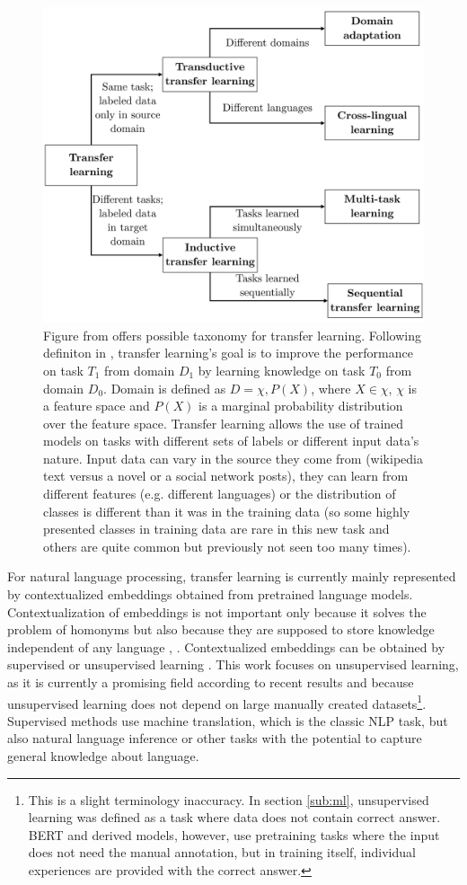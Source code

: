 \begin{figure}[h]
\centering
\includegraphics[width=0.7\columnwidth]{../img/tl_taxonomy}
\caption{Figure from \protect\citep{Ruder2019} offers possible taxonomy for transfer learning. %
Following definiton in \citep{Pan2009}, transfer learning's goal is to improve the performance on task $T_1$ from domain $D_1$ by learning knowledge on task $T_0$ from domain $D_0$. Domain is defined as $D = {\chi,P(X)}$, where $X \in \chi$, $\chi$ is a feature space and $P(X)$ is a marginal probability distribution over the feature space. Transfer learning allows the use of trained models on tasks with different sets of labels or different input data's nature. Input data can vary in the source they come from (wikipedia text versus a novel or a social network posts), they can learn from different features (e.g. different languages) or the distribution of classes is different than it was in the training data (so some highly presented classes in training data are rare in this new task and others are quite common but previously not seen too many times).
}
\label{pic:tl_taxonomy}
\end{figure}
For natural language processing, transfer learning is currently mainly represented by contextualized embeddings obtained from pretrained language models.
Contextualization of embeddings is not important only because it solves the problem of homonyms but also because they are supposed to store knowledge independent of any language \citep{Feijo2020}, \citep{Hewitt2020}. Contextualized embeddings can be obtained by supervised or unsupervised learning \citep{Liu2020}. This work focuses on unsupervised learning, as it is currently a promising field according to recent results and because unsupervised learning does not depend on large manually created datasets\footnote{This is a slight terminology inaccuracy. In section \ref{sub:ml}, unsupervised learning was defined as a task where data does not contain correct answer. BERT and derived models, however, use pretraining tasks where the input does not need the manual annotation, but in training itself, individual experiences are provided with the correct answer.}. Supervised methods use machine translation, which is the classic NLP task, but also natural language inference or other tasks with the potential to capture general knowledge about language.
